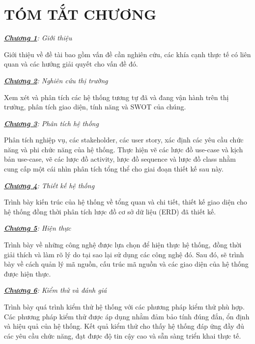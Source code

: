 \clearpage

\section*{TÓM TẮT CHƯƠNG}

\textit{\underline{\textbf{Chương 1}}: Giới thiệu} 

Giới thiệu về đề tài bao gồm vấn đề cần nghiên cứu, các khía cạnh thực tế có liên quan và các hướng giải quyết cho vấn đề đó.
\vspace{0.5cm}

\textit{\underline{\textbf{Chương 2}}: Nghiên cứu thị trường} 

Xem xét và phân tích các hệ thống tương tự đã và đang vận hành trên thị trường, phân tích giao diện, tính năng và SWOT của chúng.
\vspace{0.5cm}

\textit{\underline{\textbf{Chương 3}}: Phân tích hệ thống}

Phân tích nghiệp vụ, các stakeholder, các user story, xác định các yêu cầu chức năng và phi chức năng của hệ thống. Thực hiện vẽ các lược đồ use-case và kịch bản use-case, vẽ các lược đồ activity,  lược đồ sequence và lược đồ class nhằm cung cấp một cái nhìn phân tích tổng thể cho giai đoạn thiết kế sau này.
\vspace{0.5cm}

\textit{\underline{\textbf{Chương 4}}: Thiết kế hệ thống}

Trình bày kiến trúc của hệ thống về tổng quan và chi tiết, thiết kế giao diện cho hệ thống đồng thời phân tích lược đồ cơ sở dữ liệu (ERD) đã thiết kế.
\vspace{0.5cm}

\textit{\underline{\textbf{Chương 5}}: Hiện thực}

Trình bày về những công nghệ được lựa chọn để hiện thực hệ thống, đồng thời giải thích và làm rõ lý do tại sao lại sử dụng các công nghệ đó. Sau đó, sẽ trình bày về cách quản lý mã nguồn, cấu trúc mã nguồn và các giao diện của hệ thống được hiện thực.
\vspace{0.5cm}

\textit{\underline{\textbf{Chương 6}}: Kiểm thử và đánh giá}

Trình bày quá trình kiểm thử hệ thống với các phương pháp kiểm thử phù hợp. Các phương pháp kiểm thử được áp dụng nhằm đảm bảo tính đúng đắn, ổn định và hiệu quả của hệ thống. Kết quả kiểm thử cho thấy hệ thống đáp ứng đầy đủ các yêu cầu chức năng, đạt được độ tin cậy cao và sẵn sàng triển khai thực tế.


